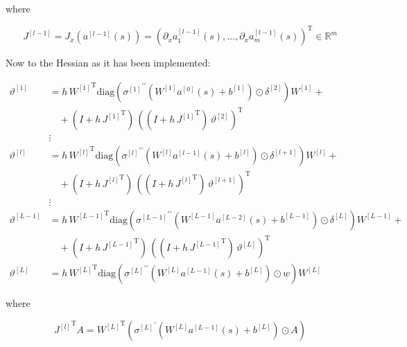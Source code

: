 where 

\begin{equation*}
    J^{[l-1]} = J_x(a^{[l-1]}(s)) = \left( \partial_x a^{[l-1]}_1(s), \ldots, \partial_x a^{[l-1]}_m(s) \right)^{\mathrm{T}} \in \mathbb{R}^{m}
\end{equation*}


Now to the Hessian as it has been implemented: 

\begin{align*}
    \vartheta^{[1]} & = h \, {W^{[1]}}^{\mathrm{T}} \mathrm{diag}({\sigma^{[1]}}^{\prime \prime}(W^{[1]} a^{[0]}(s) + b^{[1]}) \odot \delta^{[2]}) W^{[1]} + \\
    & \quad + \left( I + h \, {J^{[1]}}^{\mathrm{T}} \right) \, \left( \left(I + h \, {J^{[1]}}^{\mathrm{T}} \right) \, \vartheta^{[2]} \right)^{\mathrm{T}} \\ 
    &\vdots\\
    \vartheta^{[l]} & = h \, {W^{[l]}}^{\mathrm{T}} \mathrm{diag}({\sigma^{[l]}}^{\prime \prime}(W^{[l]} a^{[l-1]}(s) + b^{[l]}) \odot \delta^{[l+1]}) W^{[l]} + \\
    & \quad + \left( I + h \, {J^{[l]}}^{\mathrm{T}} \right) \, \left( \left(I + h \, {J^{[l]}}^{\mathrm{T}} \right) \, \vartheta^{[l+1]} \right)^{\mathrm{T}} \\ 
    &\vdots\\
    \vartheta^{[L-1]} & = h \, {W^{[L-1]}}^{\mathrm{T}} \mathrm{diag}({\sigma^{[L-1]}}^{\prime \prime}(W^{[L-1]} a^{[L-2]}(s) + b^{[L-1]}) \odot \delta^{[L]}) W^{[L-1]} + \\
    & \quad + \left( I + h \, {J^{[L-1]}}^{\mathrm{T}} \right) \, \left( \left(I + h \, {J^{[L-1]}}^{\mathrm{T}} \right) \, \vartheta^{[L]} \right)^{\mathrm{T}} \\
    \vartheta^{[L]} &  = h \, {W^{[L]}}^{\mathrm{T}} \mathrm{diag}({\sigma^{[L]}}^{\prime \prime}(W^{[L]} a^{[L-1]}(s) + b^{[L]}) \odot w) W^{[L]} 
\end{align*}

where 

\begin{equation*}
    {J^{[l]}}^{\mathrm{T}} A = {W^{[L]}}^{\mathrm{T}} \left( {\sigma^{[L]}}^{\prime}(W^{[L]} a^{[L-1]}(s) + b^{[L]}) \odot A \right)
\end{equation*}